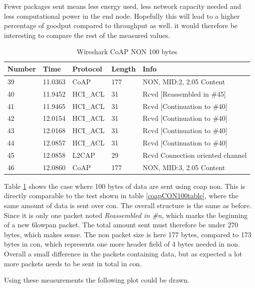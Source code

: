 Fewer packages sent means less energy used, less network capacity needed and less computational power in the end node. Hopefully this will lead to a higher percentage of goodput compared to throughput as well. it would therefore be interesting to compare the rest of the measured values.

\begin{table}[]
\small
\centering
\caption{Wireshark CoAP NON 100 bytes}
\label{coapNON100table}
\begin{tabular}{lllll}
\hline
Number & Time    & Protocol & Length & Info   							  \\ \hline                          
39     & 11.0363 & CoAP     & 177    & NON, MID:2, 2.05 Content         \\
40     & 11.9452 & HCI\_ACL & 31     & Rcvd {[}Reassembled in \#45{]}   \\
41     & 11.9465 & HCI\_ACL & 31     & Rcvd {[}Continuation to \#40{]}  \\
42     & 12.0154 & HCI\_ACL & 31     & Rcvd {[}Continuation to \#40{]}  \\
43     & 12.0168 & HCI\_ACL & 31     & Rcvd {[}Continuation to \#40{]}  \\
44     & 12.0857 & HCI\_ACL & 31     & Rcvd {[}Continuation to \#40{]}  \\
45     & 12.0858 & L2CAP    & 29     & Rcvd Connection oriented channel \\
46     & 12.0860 & CoAP     & 177    & NON, MID:3, 2.05 Content         \\ \hline
\end{tabular}
\end{table}

Table \ref{coapNON100table} shows the case where 100 bytes of data are sent using \gls{coap} \gls{non}. This is directly comparable to the test shown in table \ref{coapCON100table}, where the same amount of data is sent over \gls{con}. The overall structure is the same as before. Since it is only one packet noted \textit{Reassembled in \#n}, which marks the beginning of a new \gls{6lowpan} packet. The total amount sent must therefore be under 270 bytes, which makes sense. The \gls{non} packet size is here 177 bytes, compared to 173 bytes in \gls{con}, which represents one more header field of 4 bytes needed in \gls{non}. Overall a small difference in the packets containing data, but as expected a lot more packets needs to be sent in total in \gls{con}.


Using these measurements the following plot could be drawn. 

